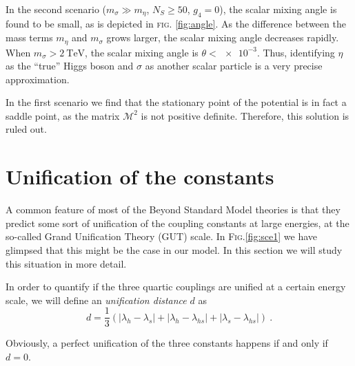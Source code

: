 \documentclass[aps,prd,preprintnumbers,nofootinbibn,twocolumn]{revtex4}
\begin{document}
In the second scenario ($m_\sigma \gg m_\eta$, $N_S \geq 50$, $g_4=0$), the scalar mixing angle is found to be small, as is depicted in \textsc{fig.} \ref{fig:angle}. As the difference between the mass terms $m_\eta$ and $m_\sigma$ grows larger, the scalar mixing angle decreases rapidly. When $m_\sigma > \SI{2}{\tera\electronvolt}$, the scalar mixing angle is $\theta < \num{e-3}$. Thus, identifying $\eta$ as the ``true'' Higgs boson and $\sigma$ as another scalar particle is a very precise approximation. 

In the first scenario we find that the stationary point of the potential is in fact a saddle point, as the matrix $\mathcal{M}^2$ is not positive definite. Therefore, this solution is ruled out.


\section{Unification of the constants}\label{sec:GUT}

A common feature of most of the Beyond Standard Model theories is that they predict some sort of unification of the coupling constants at large energies, at the so-called Grand Unification Theory (GUT) scale. In \textsc{Fig.}\ref{fig:sce1} we have glimpsed that this might be the case in our model. In this section we will study this situation in more detail.

In order to quantify if the three quartic couplings are unified at a certain energy scale, we will define an \textit{unification distance} $d$ as
\begin{equation}
d = \frac{1}{3}(|\lambda_h - \lambda_s| + |\lambda_h - \lambda_{hs}|+ |\lambda_s - \lambda_{hs}|)\ .
\end{equation}

Obviously, a perfect unification of the three constants happens if and only if $d=0$.
\end{document}
